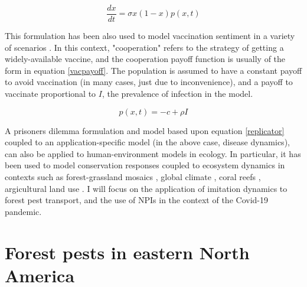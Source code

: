 \begin{equation}
    \frac{dx}{dt} = \sigma x(1 - x)p(x,t) 
    \label{replicator}
\end{equation}


This formulation has been also used to model vaccination sentiment in a variety of scenarios \cite{oraby2014influence,bauch2004vaccination,bauch2005imitation,bauch2012evolutionary}. In this context, "cooperation" refers to the strategy of getting a widely-available vaccine, and the cooperation payoff function is usually of the form in equation \ref{vacpayoff}. The population is assumed to have a constant payoff to avoid vaccination (in many cases, just due to inconvenience), and a payoff to vaccinate proportional to $I$, the prevalence of infection in the model. 

\begin{equation}
    p(x,t) = - c + \rho I
    \label{vacpayoff}
\end{equation}


A prisoners dilemma formulation and model based upon equation \ref{replicator} coupled to an application-specific model (in the above case, disease dynamics), can also be applied to human-environment models in ecology. In particular, it has been used to model conservation responses coupled to ecosystem dynamics in contexts such as forest-grassland mosaics \cite{innes2013impact,henderson2016alternative}, global climate \cite{bury2019charting}, coral reefs \cite{thampi2018socio}, argicultural land use \cite{gooding2018forest}. I will focus on the application of imitation dynamics to forest pest transport, and the use of NPIs in the context of the Covid-19 pandemic.


\section{Forest pests in eastern North America}

